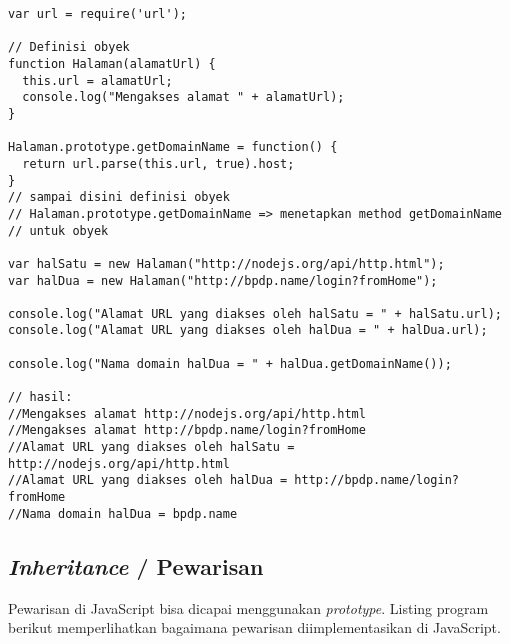 \lstset{language=JavaScript,caption=Definisi obyek di JavaScript}
\begin{lstlisting}
var url = require('url');

// Definisi obyek
function Halaman(alamatUrl) {
  this.url = alamatUrl;
  console.log("Mengakses alamat " + alamatUrl);
}

Halaman.prototype.getDomainName = function() {
  return url.parse(this.url, true).host; 
}
// sampai disini definisi obyek
// Halaman.prototype.getDomainName => menetapkan method getDomainName
// untuk obyek

var halSatu = new Halaman("http://nodejs.org/api/http.html");
var halDua = new Halaman("http://bpdp.name/login?fromHome");

console.log("Alamat URL yang diakses oleh halSatu = " + halSatu.url);
console.log("Alamat URL yang diakses oleh halDua = " + halDua.url);

console.log("Nama domain halDua = " + halDua.getDomainName());

// hasil:
//Mengakses alamat http://nodejs.org/api/http.html
//Mengakses alamat http://bpdp.name/login?fromHome
//Alamat URL yang diakses oleh halSatu = http://nodejs.org/api/http.html
//Alamat URL yang diakses oleh halDua = http://bpdp.name/login?fromHome
//Nama domain halDua = bpdp.name
\end{lstlisting}

\subsection{\textit{Inheritance} / Pewarisan}

Pewarisan di JavaScript bisa dicapai menggunakan \textit{prototype}. Listing program berikut memperlihatkan bagaimana pewarisan diimplementasikan di JavaScript.

